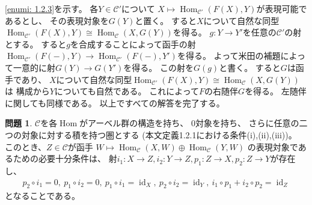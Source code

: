 \documentclass[uplatex,dvipdfmx]{jsarticle}
\makeatletter
\theoremstyle{definition}
\newtheorem{prob}[prob]{問題}
\renewenvironment{proof}[1][\proofname]{
  \pushQED{\qed}%
  \normalfont \topsep6\p@\@plus6\p@\relax
  \trivlist
  \item[\hskip\labelsep
    #1\@addpunct{\textbf{.}}]\ignorespaces
}{%
  \popQED\endtrivlist\@endpefalse
}
\providecommand{\proofname}{証明}
\DeclareMathOperator{\Hom}{\mathrm{Hom}}
\DeclareMathOperator{\id}{\mathrm{id}}
\newcommand\mcC{\mathcal{C}}
\makeatother
\begin{document}
\begin{proof}
  \ref{enumi: 1.2.3}を示す。
  各\(Y\in \mcC'\)について
  \(X\mapsto \Hom_{\mcC'}(F(X),Y)\)が表現可能であるとし、
  その表現対象を\(G(Y)\)と置く。
  すると\(X\)について自然な同型
  \(\Hom_{\mcC'}(F(X),Y)\cong \Hom_{\mcC}(X,G(Y))\)を得る。
  \(g:Y\to Y'\)を任意の\(\mcC'\)の射とする。
  すると\(g\)を合成することによって函手の射
  \(\Hom_{\mcC'}(F(-),Y) \to \Hom_{\mcC'}(F(-),Y')\)を得る。
  よって米田の補題によって一意的に射\(G(Y)\to G(Y')\)を得る。
  この射を\(G(g)\)と書く。
  すると\(G\)は函手であり、
  \(X\)について自然な同型\(\Hom_{\mcC'}(F(X),Y)\cong \Hom_{\mcC}(X,G(Y))\)は
  構成から\(Y\)についても自然である。
  これによって\(F\)の右随伴\(G\)を得る。
  左随伴に関しても同様である。
  以上ですべての解答を完了する。
\end{proof}





\begin{prob}\label{prob: 1.3}
  \(\mcC\)を各\(\Hom\)がアーベル群の構造を持ち、
  \(0\)対象を持ち、
  さらに任意の二つの対象に対する積を持つ圏とする
  (本文定義1.2.1における条件(i),(ii),(iii))。
  このとき、\(Z\in \mcC\)が函手
  \(W\mapsto \Hom_{\mcC}(X,W)\oplus \Hom_{\mcC}(Y,W)\)
  の表現対象であるための必要十分条件は、
  射\(i_1:X\to Z, i_2:Y\to Z, p_1: Z\to X, p_2:Z\to Y\)が存在し、
  \begin{align*}
    p_2\circ i_1 = 0, \ p_1 \circ i_2 = 0, \
    p_1\circ i_1 = \id_X, \ p_2\circ i_2 = \id_Y, \
    i_1\circ p_1 + i_2 \circ p_2 = \id_Z
  \end{align*}
  となることである。
\end{prob}
\end{document}
